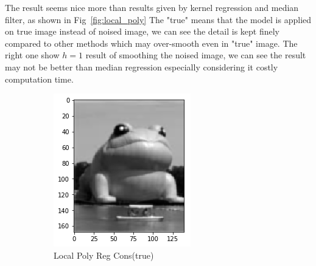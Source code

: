 \documentclass{beamer}
\begin{document}
\begin{frame}
  The result seems nice more than results given by kernel regression and median filter, 
  as shown in Fig~\ref{fig:local_poly} %
  The "true" means that the model is applied on true image instead of noised image,
  we can see the detail is kept finely compared to other methods which may over-smooth even in "true" image.
  The right one show $h=1$ result of smoothing the noised image, we can see the result may not be better than median regression especially considering
  it costly computation time. 

  \begin{figure}[htb]
    \centering
    \begin{subfigure}[b]{0.24\linewidth}
      \includegraphics[width=\linewidth]{images/poly_nr.png}
      \caption{Local Poly Reg Cons(true)}
    \end{subfigure}
    \begin{subfigure}[b]{0.24\linewidth}

\end{subfigure}
\end{figure}
\end{frame}
\end{document}
